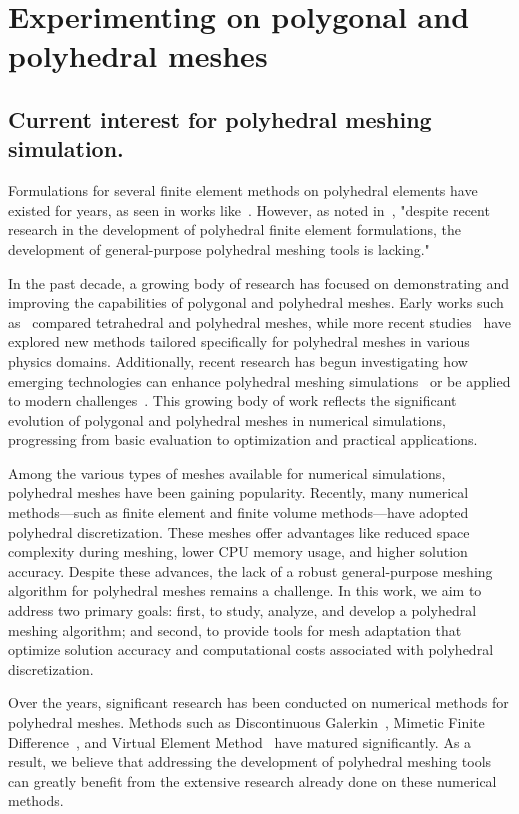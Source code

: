 \documentclass{article}
\begin{document}
\section{Experimenting on polygonal and polyhedral meshes}

\subsection{Current interest for polyhedral meshing simulation.}
Formulations for several finite element methods on polyhedral elements have existed for years, as seen in works like~\cite{rashid2006three,bishop2014displacement,gain2014virtual}. However, as noted in~\cite{bishop2020polyhedral}, "despite recent research in the development of polyhedral finite element formulations, the development of general-purpose polyhedral meshing tools is lacking."

In the past decade, a growing body of research has focused on demonstrating and improving the capabilities of polygonal and polyhedral meshes. Early works such as~\cite{spiegel2011tetrahedral} compared tetrahedral and polyhedral meshes, while more recent studies~\cite{vacca2017virtual,lipnikov2011mimetic,antonietti2018high} have explored new methods tailored specifically for polyhedral meshes in various physics domains. Additionally, recent research has begun investigating how emerging technologies can enhance polyhedral meshing simulations~\cite{antonietti2022machine} or be applied to modern challenges~\cite{LI2024111846}. This growing body of work reflects the significant evolution of polygonal and polyhedral meshes in numerical simulations, progressing from basic evaluation to optimization and practical applications.

Among the various types of meshes available for numerical simulations, polyhedral meshes have been gaining popularity. Recently, many numerical methods—such as finite element and finite volume methods—have adopted polyhedral discretization. These meshes offer advantages like reduced space complexity during meshing, lower CPU memory usage, and higher solution accuracy. Despite these advances, the lack of a robust general-purpose meshing algorithm for polyhedral meshes remains a challenge. In this work, we aim to address two primary goals: first, to study, analyze, and develop a polyhedral meshing algorithm; and second, to provide tools for mesh adaptation that optimize solution accuracy and computational costs associated with polyhedral discretization.

Over the years, significant research has been conducted on numerical methods for polyhedral meshes. Methods such as Discontinuous Galerkin~\cite{dong2018discontinuous,antonietti2021high}, Mimetic Finite Difference~\cite{da2009mimetic,lipnikov2011mimetic,da2014mimetic}, and Virtual Element Method~\cite{cangiani2017virtual,sorgente2022polyhedral} have matured significantly. As a result, we believe that addressing the development of polyhedral meshing tools can greatly benefit from the extensive research already done on these numerical methods.
\end{document}
